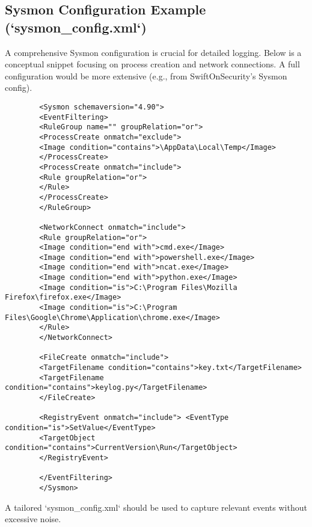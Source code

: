 \documentclass[11pt]{article}
\begin{document}
	\subsection{Sysmon Configuration Example (`sysmon_config.xml`)}
	\label{app:sysmon_config}
	A comprehensive Sysmon configuration is crucial for detailed logging. Below is a conceptual snippet focusing on process creation and network connections. A full configuration would be more extensive (e.g., from SwiftOnSecurity's Sysmon config).
	\begin{verbatim}
		<Sysmon schemaversion="4.90">
		<EventFiltering>
		<RuleGroup name="" groupRelation="or">
		<ProcessCreate onmatch="exclude">
		<Image condition="contains">\AppData\Local\Temp</Image>
		</ProcessCreate>
		<ProcessCreate onmatch="include">
		<Rule groupRelation="or">
		</Rule>
		</ProcessCreate>
		</RuleGroup>
		
		<NetworkConnect onmatch="include">
		<Rule groupRelation="or">
		<Image condition="end with">cmd.exe</Image>
		<Image condition="end with">powershell.exe</Image>
		<Image condition="end with">ncat.exe</Image>
		<Image condition="end with">python.exe</Image>
		<Image condition="is">C:\Program Files\Mozilla Firefox\firefox.exe</Image>
		<Image condition="is">C:\Program Files\Google\Chrome\Application\chrome.exe</Image>
		</Rule>
		</NetworkConnect>
		
		<FileCreate onmatch="include">
		<TargetFilename condition="contains">key.txt</TargetFilename>
		<TargetFilename condition="contains">keylog.py</TargetFilename>
		</FileCreate>
		
		<RegistryEvent onmatch="include"> <EventType condition="is">SetValue</EventType>
		<TargetObject condition="contains">CurrentVersion\Run</TargetObject>
		</RegistryEvent>
		
		</EventFiltering>
		</Sysmon>
	\end{verbatim}
	A tailored `sysmon_config.xml` should be used to capture relevant events without excessive noise.
	
	
\end{document}
